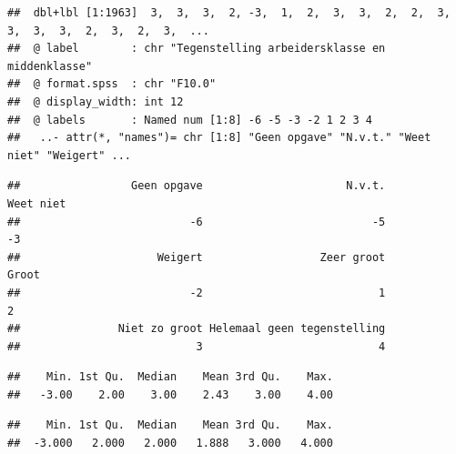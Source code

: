 \documentclass[
]{book}
\newenvironment{Shaded}{\begin{snugshade}}{\end{snugshade}}
\newcommand{\KeywordTok}[1]{\textcolor[rgb]{0.13,0.29,0.53}{\textbf{#1}}}
\newcommand{\NormalTok}[1]{#1}
\newcommand{\OperatorTok}[1]{\textcolor[rgb]{0.81,0.36,0.00}{\textbf{#1}}}
\newcommand{\StringTok}[1]{\textcolor[rgb]{0.31,0.60,0.02}{#1}}
\begin{document}
\begin{verbatim}
##  dbl+lbl [1:1963]  3,  3,  3,  2, -3,  1,  2,  3,  3,  2,  2,  3,  3,  3,  3,  2,  3,  2,  3,  ...
##  @ label        : chr "Tegenstelling arbeidersklasse en middenklasse"
##  @ format.spss  : chr "F10.0"
##  @ display_width: int 12
##  @ labels       : Named num [1:8] -6 -5 -3 -2 1 2 3 4
##   ..- attr(*, "names")= chr [1:8] "Geen opgave" "N.v.t." "Weet niet" "Weigert" ...
\end{verbatim}

\begin{Shaded}
\end{Shaded}

\begin{verbatim}
##                 Geen opgave                      N.v.t.                   Weet niet 
##                          -6                          -5                          -3 
##                     Weigert                  Zeer groot                       Groot 
##                          -2                           1                           2 
##               Niet zo groot Helemaal geen tegenstelling 
##                           3                           4
\end{verbatim}

\begin{Shaded}
\end{Shaded}

\begin{verbatim}
##    Min. 1st Qu.  Median    Mean 3rd Qu.    Max. 
##   -3.00    2.00    3.00    2.43    3.00    4.00
\end{verbatim}

\begin{Shaded}
\end{Shaded}

\begin{verbatim}
##    Min. 1st Qu.  Median    Mean 3rd Qu.    Max. 
##  -3.000   2.000   2.000   1.888   3.000   4.000
\end{verbatim}
\end{document}
